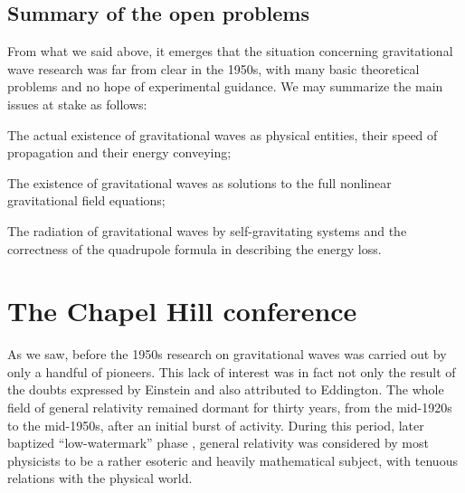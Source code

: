 \documentclass{ws-procs961x669}            %
\begin{document}
\subsection{Summary of the open problems}
From what we said above, it emerges that the situation concerning
gravitational wave research was far from clear in the 1950s, with
many basic theoretical problems and no hope of experimental
guidance. We may summarize the main issues at stake as follows:
\begin{arabiclist}[3]
\item The actual existence of gravitational waves as physical
entities, their speed of propagation and their energy conveying;
\item The existence of gravitational waves as solutions to the
full nonlinear gravitational field equations; \item The radiation
of gravitational waves by self-gravitating systems and the
correctness of the quadrupole formula in describing the energy
loss.
\end{arabiclist}
%

\section{The Chapel Hill conference}\label{ChapelHill}

As we saw, before the 1950s research on gravitational waves was
carried out by only a handful of pioneers. This lack of interest
was in fact not only the result of the doubts expressed by
Einstein and also attributed to Eddington. The whole field of
general relativity remained dormant for thirty years, from the
mid-1920s to the mid-1950s, after an initial burst of activity.
During this period, later baptized ``low-watermark'' phase
\cite{Eisenstaedt1,Eisenstaedt2,Eisenstaedt3}, general relativity
was considered by most physicists to be a rather esoteric and
heavily mathematical subject, with tenuous relations with the
physical world.
\end{document}
